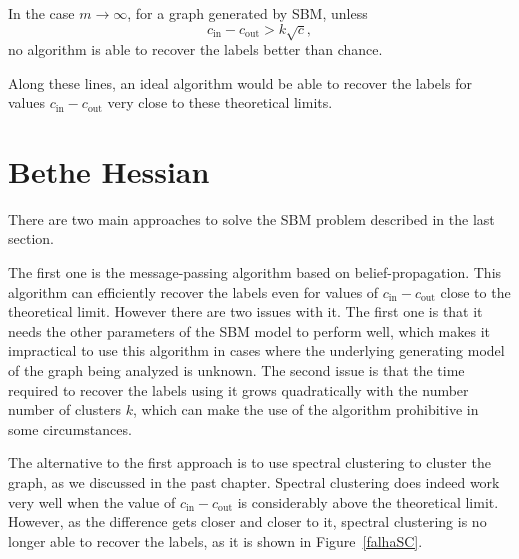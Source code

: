 \begin{conjecture}
In the case $m \rightarrow \infty$, for a graph generated by SBM, unless
   \begin{equation}
      c_\text{in} - c_\text{out} > k \sqrt{c},
   \end{equation}
   no algorithm is able to recover the labels better than chance.
\end{conjecture}

Along these lines, an ideal algorithm would be able to recover the labels for values $c_\text{in} - c_\text{out}$ very close to these theoretical limits.

\section{Bethe Hessian}
There are two main approaches to solve the SBM problem described in the last section. 

The first one is the message-passing algorithm based on belief-propagation.
This algorithm can efficiently recover the labels even for values of $c_\text{in} - c_\text{out}$ close to the theoretical limit.
However there are two issues with it.
The first one is that it needs the other parameters of the SBM model to perform well, which makes it impractical to use this algorithm in cases where the underlying generating model of the graph being analyzed is unknown.
The second issue is that the time required to recover the labels using it grows quadratically with the number number of clusters $k$, which can make the use of the algorithm prohibitive in some circumstances.

The alternative to the first approach is to use spectral clustering to cluster the graph, as we discussed in the past chapter.
Spectral clustering does indeed work very well when the value of $c_\text{in} - c_\text{out}$ is considerably above the theoretical limit.
However, as the difference gets closer and closer to it, spectral clustering is no longer able to recover the labels, as it is shown in Figure~\vref{falhaSC}.


